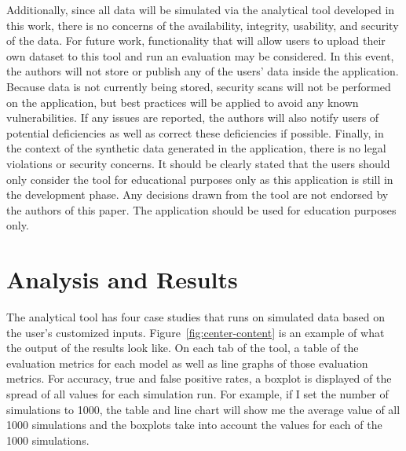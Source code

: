 \documentclass{llncs}
\begin{document}
Additionally, since all data will be simulated via the analytical tool developed in this work, there is no concerns of the availability, integrity, usability, and security of the data. For future work, functionality that will allow users to upload their own dataset to this tool and run an evaluation may be considered. In this event, the authors will not store or publish any of the users' data inside the application. Because data is not currently being stored, security scans will not be performed on the application, but best practices will be applied to avoid any known vulnerabilities. If any issues are reported, the authors will also notify users of potential deficiencies as well as correct these deficiencies if possible. Finally, in the context of the synthetic data generated in the application, there is no legal violations or security concerns. It should be clearly stated that the users should only consider the tool for educational purposes only as this application is still in the development phase. Any decisions drawn from the tool are not endorsed by the authors of this paper. The application should be used for education purposes only.  


\section{Analysis and Results}

The analytical tool has four case studies that runs on simulated data based on the user's customized inputs. Figure~\ref{fig:center-content} is an example of what the output of the results look like.  On each tab of the tool, a table of the evaluation metrics for each model as well as line graphs of those evaluation metrics.  For accuracy, true and false positive rates, a boxplot is displayed of the spread of all values for each simulation run.  For example, if I set the number of simulations to 1000, the table and line chart will show me the average value of all 1000 simulations and the boxplots take into account the  values for each of the 1000 simulations.
\end{document}
